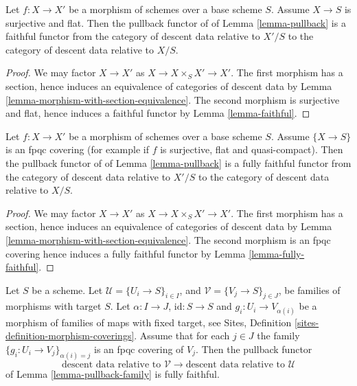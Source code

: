 \begin{lemma}
\label{lemma-morphism-source-faithfully-flat}
Let $f : X \to X'$ be a morphism of schemes over a base scheme $S$.
Assume $X \to S$ is surjective and flat. Then the pullback functor of
of Lemma \ref{lemma-pullback} is a faithful functor
from the category of descent data relative to $X'/S$ to the
category of descent data relative to $X/S$.
\end{lemma}

\begin{proof}
We may factor $X \to X'$ as $X \to X \times_S X' \to X'$.
The first morphism has a section, hence induces an equivalence of
categories of descent data by
Lemma \ref{lemma-morphism-with-section-equivalence}.
The second morphism is surjective and flat, hence induces a
faithful functor by Lemma \ref{lemma-faithful}.
\end{proof}

\begin{lemma}
\label{lemma-morphism-source-fpqc-covering}
Let $f : X \to X'$ be a morphism of schemes over a base scheme $S$.
Assume $\{X \to S\}$ is an fpqc covering (for example if $f$ is
surjective, flat and quasi-compact).
Then the pullback functor of of Lemma \ref{lemma-pullback} is a
fully faithful functor from the category of descent data relative
to $X'/S$ to the category of descent data relative to $X/S$.
\end{lemma}

\begin{proof}
We may factor $X \to X'$ as $X \to X \times_S X' \to X'$.
The first morphism has a section, hence induces an equivalence of
categories of descent data by
Lemma \ref{lemma-morphism-with-section-equivalence}.
The second morphism is an fpqc covering
hence induces a fully faithful functor by Lemma \ref{lemma-fully-faithful}.
\end{proof}

\begin{lemma}
\label{lemma-fpqc-refinement-coverings-fully-faithful}
Let $S$ be a scheme.
Let $\mathcal{U} = \{U_i \to S\}_{i \in I}$, and
$\mathcal{V} = \{V_j \to S\}_{j \in J}$,
be families of morphisms with target $S$.
Let $\alpha : I \to J$, $\text{id} : S \to S$ and
$g_i : U_i \to V_{\alpha(i)}$ be a morphism of families
of maps with fixed target, see
Sites, Definition \ref{sites-definition-morphism-coverings}.
Assume that for each $j \in J$ the family
$\{g_i : U_i \to V_j\}_{\alpha(i) = j}$ is an fpqc
covering of $V_j$. Then the pullback functor
$$
\text{descent data relative to }
\mathcal{V}
\longrightarrow
\text{descent data relative to }
\mathcal{U}
$$
of Lemma \ref{lemma-pullback-family} is fully faithful.
\end{lemma}

